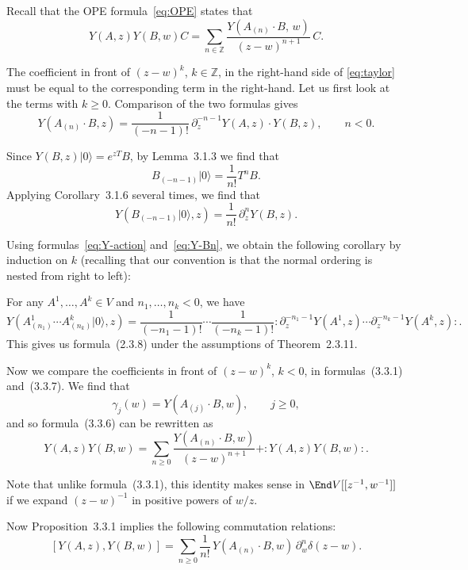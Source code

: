 \documentclass[12pt]{article}
\begin{document}
Recall that the OPE formula~\eqref{eq:OPE} states that
\[
    Y(A,z)Y(B,w)C = \sum_{n\in\mathbb{Z}} \frac{Y(A_{(n)}\cdot B,\,w)}{(z-w)^{n+1}}\,C.
\]

The coefficient in front of $(z-w)^k$, $k\in\mathbb{Z}$, in the right-hand side of \eqref{eq:taylor} must be equal to the corresponding term in the right-hand.
Let us first look at the terms with $k\ge0$.
Comparison of the two formulas gives
\begin{equation}\label{eq:Y-action}
    Y(A_{(n)}\cdot B, z)
    = \frac{1}{(-n-1)!}\,\partial_z^{-n-1}Y(A,z)\cdot Y(B,z),
    \qquad n<0.
\end{equation}

Since $Y(B,z)|0\rangle = e^{zT}B$, by Lemma~3.1.3 we find that
\[
    B_{(-n-1)}|0\rangle = \frac{1}{n!}T^nB.
\]
Applying Corollary~3.1.6 several times, we find that
\begin{equation}\label{eq:Y-Bn}
    Y(B_{(-n-1)}|0\rangle,z)
    = \frac{1}{n!}\,\partial_z^n Y(B,z).
\end{equation}

Using formulas~\eqref{eq:Y-action} and~\eqref{eq:Y-Bn}, we obtain the following corollary by induction on $k$ (recalling that our convention is that the normal ordering is nested from right to left):

\begin{corollary}[3.3.5]
    For any $A^1,\dots,A^k\in V$ and $n_1,\dots,n_k<0$, we have
    \[
        Y(A^1_{(n_1)}\cdots A^k_{(n_k)}|0\rangle,z)
        = \frac{1}{(-n_1-1)!}\cdots\frac{1}{(-n_k-1)!}
        :\partial_z^{-n_1-1}Y(A^1,z)\cdots\partial_z^{-n_k-1}Y(A^k,z):.
    \]
    This gives us formula~(2.3.8) under the assumptions of Theorem~2.3.11.
\end{corollary}


Now we compare the coefficients in front of $(z-w)^k$, $k<0$, in formulas~(3.3.1) and~(3.3.7).
We find that
\[
    \gamma_j(w) = Y(A_{(j)}\cdot B, w), \qquad j\ge0,
\]
and so formula~(3.3.6) can be rewritten as
\begin{equation}\label{eq:ope-positive}
    Y(A,z)Y(B,w)
    = \sum_{n\ge0} \frac{Y(A_{(n)}\cdot B, w)}{(z-w)^{n+1}}
    + :Y(A,z)Y(B,w):.
\end{equation}

Note that unlike formula~(3.3.1), this identity makes sense in $\End V[[z^{-1},w^{-1}]]$ if we expand $(z-w)^{-1}$ in positive powers of $w/z$.

Now Proposition~3.3.1 implies the following commutation relations:
\begin{equation}\label{eq:Y-commutator}
    [Y(A,z),Y(B,w)]
    = \sum_{n\ge0}\frac{1}{n!}\,Y(A_{(n)}\cdot B,w)\,\partial_w^n\delta(z-w).
\end{equation}
\end{document}
